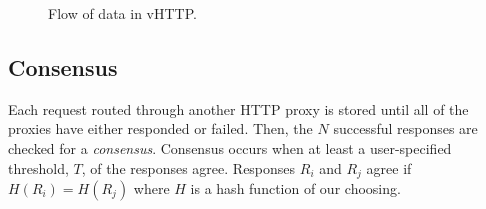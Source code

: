 \begin{figure}[b]
  \centering


  \caption{Flow of data in vHTTP.}
  \label{fig:proxy-data-flow}
\end{figure}

\subsection{Consensus}

Each request routed through another HTTP proxy is stored until all of the
proxies have either responded or failed. Then, the $N$ successful responses are
checked for a \textit{consensus}. Consensus occurs when at least a
user-specified threshold, $T$, of the responses agree. Responses $R_i$ and
$R_j$ agree if $H(R_i) = H(R_j)$ where $H$ is a hash function of our choosing.
